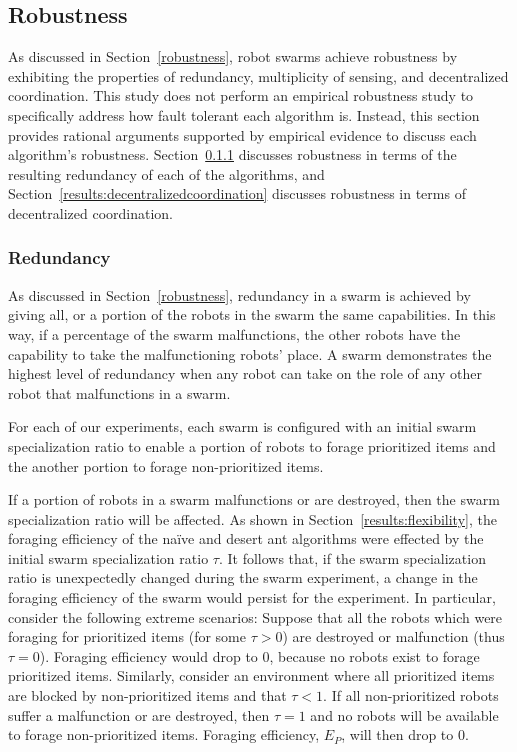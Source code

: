 \documentclass[preprint,12pt]{elsarticle}
\begin{document}
\subsection{Robustness}
\label{results:robustness}
As discussed in Section~\ref{robustness}, robot swarms achieve robustness by exhibiting the properties of redundancy, multiplicity of sensing, and decentralized coordination. This study does not perform an empirical robustness study to specifically address how fault tolerant each algorithm is. Instead, this section provides rational arguments supported by empirical evidence to discuss each algorithm's robustness. Section~\ref{results:redundancy} discusses robustness in terms of the resulting redundancy of each of the algorithms, and Section~\ref{results:decentralizedcoordination} discusses robustness in terms of decentralized coordination.

\subsubsection{Redundancy}
\label{results:redundancy}

As discussed in Section~\ref{robustness}, redundancy in a swarm is achieved by giving all, or a portion of the robots in the swarm the same capabilities. In this way, if a percentage of the swarm malfunctions, the other robots have the capability to take the malfunctioning robots' place. A swarm demonstrates the highest level of redundancy when any robot can take on the role of any other robot that malfunctions in a swarm. 

For each of our experiments, each swarm is configured with an initial swarm specialization ratio to enable a portion of robots to forage prioritized items and the another portion to forage non-prioritized items. 

If a portion of robots in a swarm malfunctions or are destroyed, then the swarm specialization ratio will be affected. As shown in Section~\ref{results:flexibility}, the foraging efficiency of the na\"ive and desert ant algorithms were effected by the initial swarm specialization ratio $\tau$. It follows that, if the swarm specialization ratio is unexpectedly changed during the swarm experiment, a change in the foraging efficiency of the swarm would persist for the experiment. In particular, consider the following extreme scenarios: Suppose that all the robots which were foraging for prioritized items (for some $\tau > 0$) are destroyed or malfunction (thus $\tau=0$). Foraging efficiency would drop to 0, because no robots exist to forage prioritized items. Similarly, consider an environment where all prioritized items are blocked by non-prioritized items and that $\tau < 1$. If all non-prioritized robots suffer a malfunction or are destroyed, then $\tau=1$ and no robots will be available to forage non-prioritized items. Foraging efficiency, $E_P$, will then drop to 0. 
\end{document}
